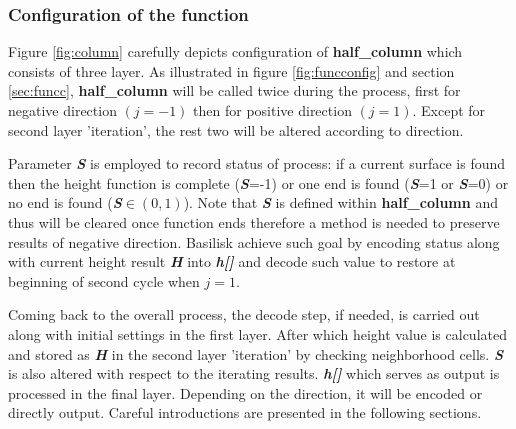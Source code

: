 \documentclass[a4paper]{article}
\newcommand{\func}[1]{\textbf{\textcolor{function}{#1}}}
\newcommand{\para}[1]{\textbf{\emph{\textcolor{para}{#1}}}}
\begin{document}
\subsubsection{Configuration of the function}
Figure \ref{fig:column} carefully depicts configuration of \func{half\_column} which consists of three layer. As illustrated in figure \ref{fig:funcconfig} and section \ref{sec:funcc}, \func{half\_column} will be called twice during the process, first for negative direction $(j=-1)$ then for positive direction $(j=1)$. Except for second layer 'iteration', the rest two will be altered according to direction.\par
Parameter \para{S} is employed to record status of process: if a current surface is found then the height function is complete (\para{S}=-1) or one end is found (\para{S}=1 or \para{S}=0) or no end is found (\para{S}$\in (0,1)$). Note that \para{S} is defined within \func{half\_column} and thus will be cleared once function ends therefore a method is needed to preserve results of negative direction. Basilisk achieve such goal by encoding status along with current height result \para{H} into \para{h[]} and decode such value to restore at beginning of second cycle when $j=1$.\par
Coming back to the overall process, the decode step, if needed, is carried out along with initial settings in the first layer. After which height value is calculated and stored as \para{H} in the second layer 'iteration' by checking neighborhood cells. \para{S} is also altered with respect to the iterating results. \para{h[]} which serves as output is processed in the final layer. Depending on 
the direction, it will be encoded or directly output. Careful introductions are presented in the following sections.
\end{document}
